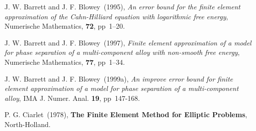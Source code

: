 \newpage
\begin{thebibliography}{999}
J. W. Barrett and J. F. Blowey~(1995),  
{\it An error bound for the finite element approximation of the Cahn-Hilliard equation with logarithmic free energy}, 
Numerische Mathematics, 
{\bf 72}, pp~1--20.

J. W. Barrett and J. F. Blowey~(1997),  
{\it Finite element approximation of a model for phase separation of a multi-component alloy with non-smooth free energy}, 
Numerische Mathematics, 
{\bf 77}, pp~1--34.

J. W. Barrett and J. F. Blowey~(1999a),  
{\it An improve error bound for finite element approximation of a
model for phase separation of a multi-component alloy}, 
IMA J. Numer. Anal.  
{\bf 19}, pp~147-168.

P. G. Ciarlet~(1978),
{\bf The Finite Element Method for Elliptic Problems}, 
North-Holland. 


\end{thebibliography}
